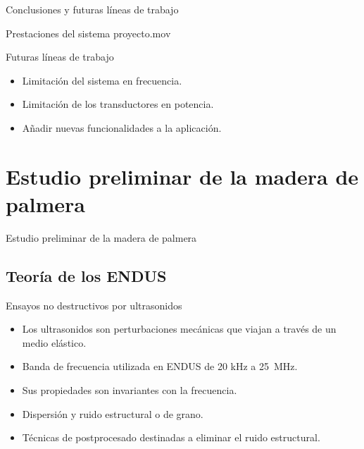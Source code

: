 \documentclass[utf8, compress]			{beamer}
\begin{document}
\begin{frame}{Conclusiones y futuras líneas de trabajo}
    \tableofcontents[currentsubsection]
\end{frame}

\begin{frame}{Prestaciones del sistema}
    \centering{}
    {proyecto.mov}
\end{frame}

\begin{frame}{Futuras líneas de trabajo}
    \begin{itemize}
	\item Limitación del sistema en frecuencia.
	\item Limitación de los transductores en potencia.
	\item Añadir nuevas funcionalidades a la aplicación.
    \end{itemize}
\end{frame}


\section{Estudio preliminar de la madera de palmera}

\begin{frame}{Estudio preliminar de la madera de palmera}
    \tableofcontents[currentsection]
\end{frame}


\subsection{Teoría de los ENDUS}

\begin{frame}{Ensayos no destructivos por ultrasonidos}
    \begin{itemize}
	\item Los ultrasonidos son perturbaciones mecánicas que viajan a través
	    de un medio elástico.
	\item Banda de frecuencia utilizada en ENDUS de 20 kHz a 25~MHz.
	\item Sus propiedades son invariantes con la frecuencia.
	\item Dispersión y ruido estructural o de grano.
	\item Técnicas de postprocesado destinadas a eliminar el ruido
	    estructural.
    \end{itemize}
\end{frame}
\end{document}
